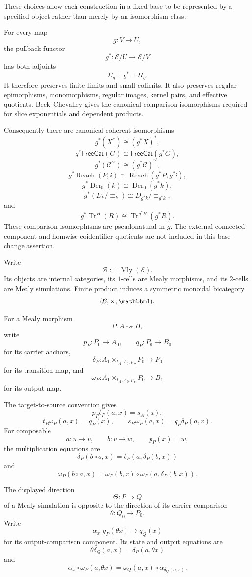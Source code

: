 These choices allow each construction in a fixed base to be represented by a specified object rather
than merely by an isomorphism class.

For every map
\[
  g:V\to U,
\]
the pullback functor
\[
  g^*:\mathcal E/U\longrightarrow\mathcal E/V
\]
has both adjoints
\[
  \Sigma_g\dashv g^*\dashv\Pi_g.
\]
It therefore preserves finite limits and small colimits. It also preserves regular epimorphisms,
monomorphisms, regular images, kernel pairs, and effective quotients. Beck--Chevalley gives the
canonical comparison isomorphisms required for slice exponentials and dependent products.

Consequently there are canonical coherent isomorphisms
\[
  g^*(X^\ast)\cong(g^*X)^\ast,
\]
\[
  g^*\mathsf{FreeCat}(G)
  \cong
  \mathsf{FreeCat}(g^*G),
\]
\[
  g^*(\mathcal C^\simeq)
  \cong
  (g^*\mathcal C)^\simeq,
\]
\[
  g^*\operatorname{Reach}(P,i)
  \cong
  \operatorname{Reach}(g^*P,g^*i),
\]
\[
  g^*\operatorname{Der}_0(k)
  \cong
  \operatorname{Der}_0(g^*k),
\]
\[
  g^*(D_k/{\equiv_k})
  \cong
  D_{g^*k}/{\equiv_{g^*k}},
\]
and
\[
  g^*\operatorname{Tr}^{H}(R)
  \cong
  \operatorname{Tr}^{g^*H}(g^*R).
\]
These comparison isomorphisms are pseudonatural in \(g\). The external connected-component and
homwise coidentifier quotients are not included in this base-change assertion.

Write
\[
  \mathcal B:=\operatorname{Mly}(\mathcal E).
\]
Its objects are internal categories, its \(1\)-cells are Mealy morphisms, and its \(2\)-cells are
Mealy simulations. Finite product induces a symmetric monoidal bicategory
\[
  (\mathcal B,\times,\mathbbm1).
\]

For a Mealy morphism
\[
  P:A\rightsquigarrow B,
\]
write
\[
  p_P:P_0\to A_0,
  \qquad
  q_P:P_0\to B_0
\]
for its carrier anchors,
\[
  \delta_P:
  A_1\times_{t_A,A_0,p_P}P_0\to P_0
\]
for its transition map, and
\[
  \omega_P:
  A_1\times_{t_A,A_0,p_P}P_0\to B_1
\]
for its output map.

The target-to-source convention gives
\[
  p_P\delta_P(a,x)=s_A(a),
\]
\[
  t_B\omega_P(a,x)=q_P(x),
  \qquad
  s_B\omega_P(a,x)=q_P\delta_P(a,x).
\]
For composable
\[
  a:u\to v,
  \qquad
  b:v\to w,
  \qquad
  p_P(x)=w,
\]
the multiplication equations are
\[
  \delta_P(b\circ a,x)
  =
  \delta_P(a,\delta_P(b,x))
\]
and
\[
  \omega_P(b\circ a,x)
  =
  \omega_P(b,x)
  \circ
  \omega_P(a,\delta_P(b,x)).
\]

The displayed direction
\[
  \Theta:P\Longrightarrow Q
\]
of a Mealy simulation is opposite to the direction of its carrier comparison
\[
  \theta:Q_0\longrightarrow P_0.
\]
Write
\[
  \alpha_x:
  q_P(\theta x)\longrightarrow q_Q(x)
\]
for its output-comparison component. Its state and output equations are
\[
  \theta\delta_Q(a,x)
  =
  \delta_P(a,\theta x)
\]
and
\[
  \alpha_x\circ\omega_P(a,\theta x)
  =
  \omega_Q(a,x)
  \circ
  \alpha_{\delta_Q(a,x)}.
\]

